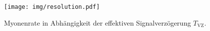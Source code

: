 \begin{figure}[htb]
    \centering
    \texttt{[image: img/resolution.pdf]}
    \caption{
        Myonenrate in Abhängigkeit der effektiven Signalverzögerung
        $T_\text{VZ}$.
    }
    \label{fig:resolution}
\end{figure}
